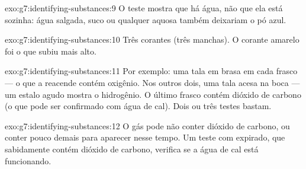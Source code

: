 \begin{solution}{exo:g7:identifying-substances:9}
O teste mostra que há água, não que ela está sozinha: água salgada, suco
ou qualquer  aquosa também deixariam o pó azul.
\end{solution}

\begin{solution}{exo:g7:identifying-substances:10}
Três corantes (três manchas). O corante amarelo foi o que subiu mais alto.
\end{solution}

\begin{solution}{exo:g7:identifying-substances:11}
Por exemplo: uma tala em brasa em cada frasco --- o que a reacende
contém oxigênio. Nos outros dois, uma tala acesa na boca --- um estalo
agudo mostra o hidrogênio. O último frasco contém dióxido de carbono (o
que pode ser confirmado com água de cal). Dois ou três testes bastam.
\end{solution}

\begin{solution}{exo:g7:identifying-substances:12}
O gás pode não conter dióxido de carbono, ou conter pouco demais para
aparecer nesse tempo. Um teste com  expirado, que sabidamente contém
dióxido de carbono, verifica se a água de cal está funcionando.
\end{solution}

